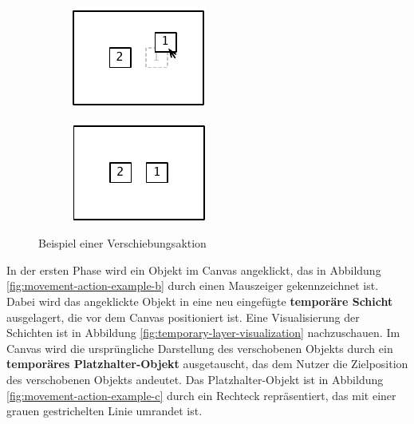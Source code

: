\begin{figure}[hbt]
\begin{subfigure}{\subfigurewidth}
        \centering
        \includegraphics[scale=\graphicsscale]{resources/movement-action-example-d}
        \caption{}
        \label{fig:movement-action-example-d}
    \end{subfigure}
    \begin{subfigure}{\subfigurewidth}
        \centering
        \includegraphics[scale=\graphicsscale]{resources/movement-action-example-e}
        \caption{}
        \label{fig:movement-action-example-e}
    \end{subfigure}
    \caption{Beispiel einer Verschiebungsaktion}
    \label{fig:movement-action-example}
\end{figure}

In der ersten Phase wird ein Objekt im Canvas angeklickt, das in Abbildung \ref{fig:movement-action-example-b} durch einen Mauszeiger gekennzeichnet ist. Dabei wird das angeklickte Objekt in eine neu eingefügte \textbf{temporäre Schicht} ausgelagert, die vor dem Canvas positioniert ist. Eine Visualisierung der Schichten ist in Abbildung \ref{fig:temporary-layer-visualization} nachzuschauen. Im Canvas wird die ursprüngliche Darstellung des verschobenen Objekts durch ein \textbf{temporäres Platzhalter-Objekt} ausgetauscht, das dem Nutzer die Zielposition des verschobenen Objekts andeutet. Das Platzhalter-Objekt ist in Abbildung \ref{fig:movement-action-example-c} durch ein Rechteck repräsentiert, das mit einer grauen gestrichelten Linie umrandet ist.

